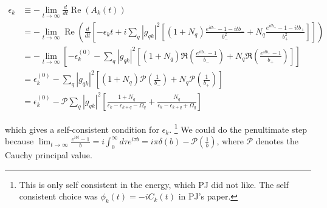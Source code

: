 \begin{align}
    \epsilon_k &\equiv -\lim_{t \rightarrow \infty} \frac{d}{d t} \operatorname{Re} \left( A_k(t) \right) \\
&= -\lim_{t \rightarrow \infty} \operatorname{Re} \left( \frac{d}{d t} \left[ -\epsilon_k t + i \sum_q |g_{qk}|^2 \left[ \left(1 + N_q \right) \frac{e^{i t b_{-}} - 1 - i t b_{-}}{b_{-}^2} + N_q \frac{e^{i t b_{+}} - 1 - i t b_{+}}{b_{+}^2} \right] \right] \right) \\
&= -\lim_{t \rightarrow \infty} \left[ -\epsilon_k^{(0)}-\sum_q\left|g_{q k}\right|^2\left[\left(1+N_q\right) \Re\left(\frac{e^{i t b_{-}}-1}{b_{-}}\right)+N_q \Re\left(\frac{e^{i t b_{+}}-1}{b_{+}}\right)\right] \right] \\
&= \epsilon_k^{(0)} - \sum_q\left|g_{q k}\right|^2\left[\left(1+N_q\right) \mathcal{P}\left(\frac{1}{b_{-}}\right)+N_q \mathcal{P}\left(\frac{1}{b_{+}}\right)\right] \\
&= \epsilon_k^{(0)} - \mathcal{P} \sum_q\left|g_{q k}\right|^2\left[\frac{1+N_q}{\epsilon_k-\epsilon_{k+q}-\Omega_q}+\frac{N_q}{\epsilon_k-\epsilon_{k+q}+\Omega_q}\right]
\end{align}


which gives a self-consistent condition for $\epsilon_k$. \footnote{This is only self consistent in the energy, which PJ did not like.  The self consistent choice was $\phi_k(t)=-iC_k(t)$ in PJ's paper.} We could do the penultimate step because $\lim_{t \rightarrow \infty}\frac{e^{i b t} -1 }{b} = i\int_0^\infty d \tau e^{i \tau b}= i \pi \delta(b) - \mathcal{P}\left( \frac{1}{b} \right)$, where $\mathcal{P}$ denotes the Cauchy principal value.



